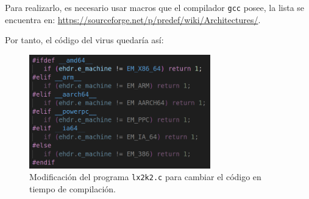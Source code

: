 \documentclass{article}
\begin{document}
Para realizarlo, es necesario usar macros que el compilador \verb|gcc| posee, la lista se encuentra en: \url{https://sourceforge.net/p/predef/wiki/Architectures/}.

\bigskip

Por tanto, el código del virus quedaría así:

\begin{figure}[H]
    \centering
    \includegraphics[width=0.7\textwidth]{imagenes/Captura desde 2022-11-25 17-21-11.png}
    \caption{Modificación del programa \texttt{lx2k2.c} para cambiar el código en tiempo de compilación.}
\end{figure}
\end{document}
